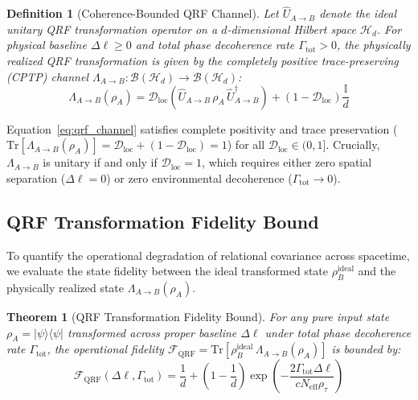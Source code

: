\documentclass[11pt,a4paper]{article}
\newtheorem{definition}{Definition}
\newtheorem{theorem}{Theorem}
\begin{document}
\begin{definition}[Coherence-Bounded QRF Channel]
Let $\hat{U}_{A \to B}$ denote the ideal unitary QRF transformation operator on a $d$-dimensional Hilbert space $\mathcal{H}_d$. For physical baseline $\Delta\ell \ge 0$ and total phase decoherence rate $\Gamma_{\mathrm{tot}} > 0$, the physically realized QRF transformation is given by the completely positive trace-preserving (CPTP) channel $\Lambda_{A \to B} : \mathcal{B}(\mathcal{H}_d) \to \mathcal{B}(\mathcal{H}_d)$:
\begin{equation}
    \Lambda_{A \to B}(\rho_A) = \mathcal{D}_{\mathrm{loc}} \left(\hat{U}_{A \to B} \, \rho_A \, \hat{U}_{A \to B}^\dagger\right) + \left(1 - \mathcal{D}_{\mathrm{loc}}\right) \frac{\mathbb{I}}{d}
    \label{eq:qrf_channel}
\end{equation}
\end{definition}

Equation~\eqref{eq:qrf_channel} satisfies complete positivity and trace preservation ($\mathrm{Tr}[\Lambda_{A \to B}(\rho_A)] = \mathcal{D}_{\mathrm{loc}} + (1 - \mathcal{D}_{\mathrm{loc}}) = 1$) for all $\mathcal{D}_{\mathrm{loc}} \in (0, 1]$. Crucially, $\Lambda_{A \to B}$ is unitary if and only if $\mathcal{D}_{\mathrm{loc}} = 1$, which requires either zero spatial separation ($\Delta\ell = 0$) or zero environmental decoherence ($\Gamma_{\mathrm{tot}} \to 0$).

\subsection{QRF Transformation Fidelity Bound}

To quantify the operational degradation of relational covariance across spacetime, we evaluate the state fidelity between the ideal transformed state $\rho_B^{\mathrm{ideal}}$ and the physically realized state $\Lambda_{A \to B}(\rho_A)$.

\begin{theorem}[QRF Transformation Fidelity Bound]
For any pure input state $\rho_A = |\psi\rangle\langle\psi|$ transformed across proper baseline $\Delta\ell$ under total phase decoherence rate $\Gamma_{\mathrm{tot}}$, the operational fidelity $\mathcal{F}_{\mathrm{QRF}} = \mathrm{Tr}\!\left[\rho_B^{\mathrm{ideal}} \, \Lambda_{A \to B}(\rho_A)\right]$ is bounded by:
\begin{equation}
    \mathcal{F}_{\mathrm{QRF}}(\Delta\ell, \Gamma_{\mathrm{tot}}) = \frac{1}{d} + \left(1 - \frac{1}{d}\right) \exp\left(-\frac{2 \Gamma_{\mathrm{tot}} \Delta\ell}{c N_{\mathrm{eff}} \rho_\tau}\right)
    \label{eq:fidelity_bound}
\end{equation}
\end{theorem}
\end{document}
